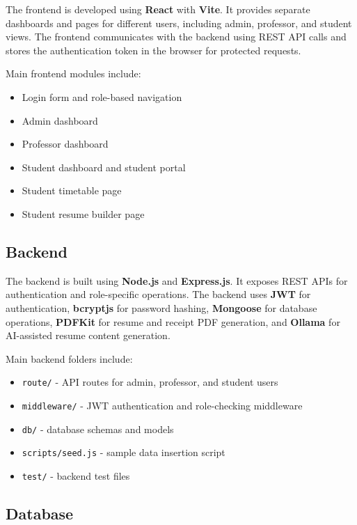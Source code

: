 \documentclass[12pt]{article}
\begin{document}
The frontend is developed using \textbf{React} with \textbf{Vite}. It provides separate dashboards and pages for different users, including admin, professor, and student views. The frontend communicates with the backend using REST API calls and stores the authentication token in the browser for protected requests.

Main frontend modules include:

\begin{itemize}
\item Login form and role-based navigation
\item Admin dashboard
\item Professor dashboard
\item Student dashboard and student portal
\item Student timetable page
\item Student resume builder page
\end{itemize}

\subsection*{Backend}

The backend is built using \textbf{Node.js} and \textbf{Express.js}. It exposes REST APIs for authentication and role-specific operations. The backend uses \textbf{JWT} for authentication, \textbf{bcryptjs} for password hashing, \textbf{Mongoose} for database operations, \textbf{PDFKit} for resume and receipt PDF generation, and \textbf{Ollama} for AI-assisted resume content generation.

Main backend folders include:

\begin{itemize}
\item \texttt{route/} - API routes for admin, professor, and student users
\item \texttt{middleware/} - JWT authentication and role-checking middleware
\item \texttt{db/} - database schemas and models
\item \texttt{scripts/seed.js} - sample data insertion script
\item \texttt{test/} - backend test files
\end{itemize}

\subsection*{Database}
\end{document}
